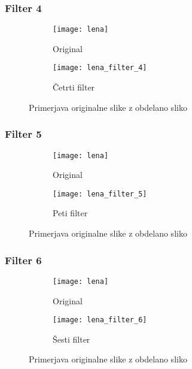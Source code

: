 \subsubsection*{Filter 4}
\begin{figure}[h]
    \centering
    \begin{subfigure}[b]{0.4\textwidth}
        \texttt{[image: lena]}
        \caption{Original}
    \end{subfigure}
    \begin{subfigure}[b]{0.4\textwidth}
        \texttt{[image: lena\_filter\_4]}
        \caption{Četrti filter}
    \end{subfigure}
    \caption{Primerjava originalne slike z obdelano sliko}
    \label{fig:lena_filter_4}
\end{figure}


\subsubsection*{Filter 5}
\begin{figure}[h]
    \centering
    \begin{subfigure}[b]{0.4\textwidth}
        \texttt{[image: lena]}
        \caption{Original}
    \end{subfigure}
    \begin{subfigure}[b]{0.4\textwidth}
        \texttt{[image: lena\_filter\_5]}
        \caption{Peti filter}
    \end{subfigure}
    \caption{Primerjava originalne slike z obdelano sliko}
    \label{fig:lena_filter_5}
\end{figure}


\subsubsection*{Filter 6}
\begin{figure}[h]
    \centering
    \begin{subfigure}[b]{0.4\textwidth}
        \texttt{[image: lena]}
        \caption{Original}
    \end{subfigure}
    \begin{subfigure}[b]{0.4\textwidth}
        \texttt{[image: lena\_filter\_6]}
        \caption{Šesti filter}
    \end{subfigure}
    \caption{Primerjava originalne slike z obdelano sliko}
    \label{fig:lena_filter_6}
\end{figure}


